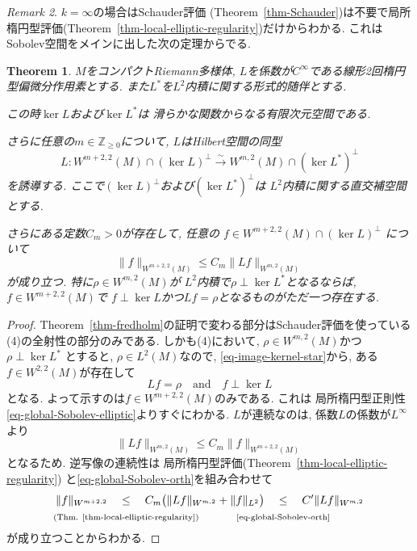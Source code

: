 \documentclass[dvipdfmx,a4paper,11pt]{article} %
\newtheorem{thm}{Theorem}[section]
\theoremstyle{definition}
\theoremstyle{remark}
\newtheorem{rem}[thm]{Remark}
\numberwithin{equation}{section}
\newcommand{\underalign}[2]{%
  \quad
  \underset{\mathclap{\raisebox{-1.6ex}{\ensuremath{\scriptstyle #1}}}}{#2}
  \quad
}
\begin{document}
\begin{rem}
\label{rem-fredholm}
$k=\infty$の場合はSchauder評価 (Theorem~\ref{thm-Schauder})は不要で局所楕円型評価(Theorem~\ref{thm-local-elliptic-regularity})だけからわかる. これはSobolev空間をメインに出した次の定理からでる. 

\begin{thm}
\label{thm-fredholm-Sobolev}
$M$をコンパクトRiemann多様体,
 $L$を係数が$C^\infty$である線形2回楕円型偏微分作用素とする.
また$L^*$を$L^2$内積に関する形式的随伴とする.

この時$\ker L$および$\ker L^*$は
滑らかな関数からなる有限次元空間である.

さらに任意の$m\in\mathbb Z_{\geq 0}$について,
$L$はHilbert空間の同型
\[
L\colon
W^{m+2,2}(M)\cap(\ker L)^\perp
\overset{\sim}{\longrightarrow}
W^{m,2}(M)\cap(\ker L^*)^\perp
\]
を誘導する.
ここで$(\ker L)^\perp$および$(\ker L^*)^\perp$は
$L^2$内積に関する直交補空間とする.

さらにある定数$C_m>0$が存在して,
任意の
$f\in W^{m+2,2}(M)\cap(\ker L)^\perp$
について
\begin{equation}
\label{eq-global-Sobolev-orth-m}
\lVert f\rVert_{W^{m+2,2}(M)}
\leq
C_m\lVert Lf\rVert_{W^{m,2}(M)}
\end{equation}
が成り立つ.
特に$\rho\in W^{m,2}(M)$が
$L^2$内積で$\rho\perp\ker L^*$となるならば,
$f\in W^{m+2,2}(M)$で
$f\perp\ker L$かつ$Lf=\rho$となるものがただ一つ存在する.
\end{thm}
\begin{proof}
Theorem~\ref{thm-fredholm}の証明で変わる部分はSchauder評価を使っている(4)の全射性の部分のみである. しかも(4)において,  
$\rho\in W^{m,2}(M)$かつ
\(
\rho\perp\ker L^*
\)
とすると, $\rho\in L^2(M)$なので, 
\eqref{eq-image-kernel-star}から, ある$f\in W^{2,2}(M)$が存在して
\[
Lf=\rho \quad \text{and} \quad f\perp\ker L
\]
となる. よって示すのは$f \in W^{m+2,2}(M)$のみである. 
これは
局所楕円型正則性\eqref{eq-global-Sobolev-elliptic}よりすぐにわかる. 
$L$が連続なのは, 係数$L$の係数が$L^\infty$より
$$
\lVert Lf\rVert_{W^{m,2}(M)}
\leq
C_m
\lVert f\rVert_{W^{m+2,2}(M)}
$$
となるため. 逆写像の連続性は
局所楕円型評価(Theorem~\ref{thm-local-elliptic-regularity})
と\eqref{eq-global-Sobolev-orth}を組み合わせて
\[
\|f\|_{W^{m+2,2}}
\underalign{\text{(Thm. \ref{thm-local-elliptic-regularity})}}{\leq}
C_m\bigl(\|Lf\|_{W^{m,2}}+\|f\|_{L^2}\bigr)
\underalign{\text{\eqref{eq-global-Sobolev-orth}}}{\leq}
C'\|Lf\|_{W^{m,2}}
\]が成り立つことからわかる. 
\end{proof}


\end{rem}
\end{document}
